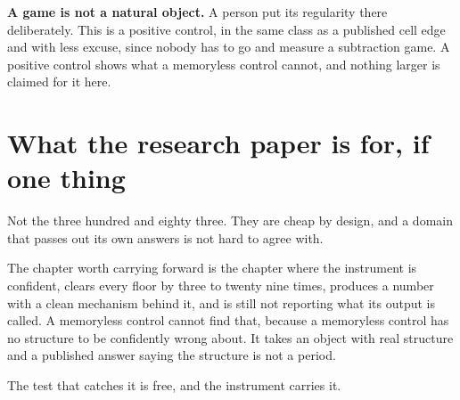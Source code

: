 \textbf{A game is not a natural object.} A person put its regularity there deliberately. This is a
positive control, in the same class as a published cell edge and with less excuse, since nobody has
to go and measure a subtraction game. A positive control shows what a memoryless control cannot, and
nothing larger is claimed for it here.

\section{What the research paper is for, if one thing}

Not the three hundred and eighty three. They are cheap by design, and a domain that passes out its
own answers is not hard to agree with.

The chapter worth carrying forward is the chapter where the instrument is confident, clears every
floor by three to twenty nine times, produces a number with a clean mechanism behind it, and is
still not reporting what its output is called. A memoryless control cannot find that, because a
memoryless control has no structure to be confidently wrong about. It takes an
object with real structure and a published answer saying the structure is not a period.

The test that catches it is free, and the instrument carries it.
